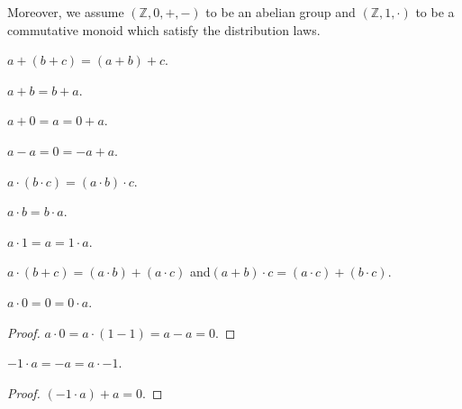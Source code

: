 \documentclass{article}
\newcommand{\Int}{\mathbb{Z}}
\begin{document}
  Moreover, we assume $(\Int, 0, +, -)$ to be an abelian group and $(\Int, 1, \cdot)$ to be a
  commutative monoid which satisfy the distribution laws.

  \begin{forthel}
    \begin{axiom}\label{AddAsso}
      $a + (b + c) = (a + b) + c$.
    \end{axiom}

    \begin{axiom}\label{AddComm}
      $a + b = b + a$.
    \end{axiom}

    \begin{axiom}\label{AddZero}
      $a + 0 = a = 0 + a$.
    \end{axiom}

    \begin{axiom}\label{AddNeg}
      $a - a = 0 = -a + a$.
    \end{axiom}

    \begin{axiom}\label{MulAsso}
      $a \cdot (b \cdot c) = (a \cdot b) \cdot c$.
    \end{axiom}

    \begin{axiom}\label{MulComm}
      $a \cdot b = b \cdot a$.
    \end{axiom}

    \begin{axiom}\label{MulOne}
      $a \cdot 1 = a = 1 \cdot a$.
    \end{axiom}

    \begin{axiom}\label{Distrib}
      $a \cdot (b + c) = (a \cdot b) + (a \cdot c)$ and$ (a + b) \cdot c = (a \cdot c) + (b \cdot c)$.
    \end{axiom}

    \begin{lemma}\label{MulZero}
      $a \cdot 0 = 0 = 0 \cdot a$.
    \end{lemma}
    \begin{proof}
      $a \cdot 0 = a \cdot (1 - 1) = a - a = 0$.
    \end{proof}

    \begin{lemma}\label{MulMinOne}
      $-1 \cdot a = -a = a \cdot -1$.
    \end{lemma}
    \begin{proof}
      $(-1 \cdot a) + a = 0$.
    \end{proof}
  \end{forthel}
\end{document}

